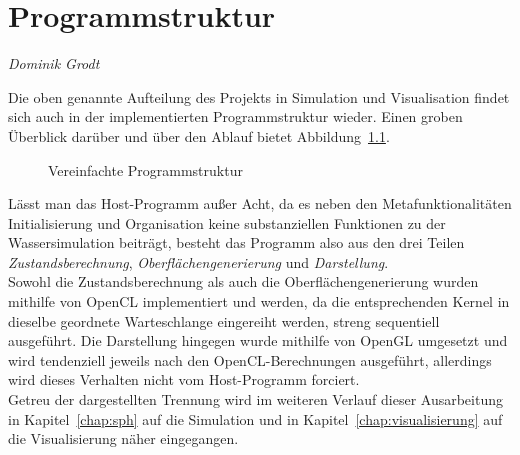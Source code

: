 \chapter{Programmstruktur}
\thispagestyle{empty}

\begin{center}
\emph{{\small Dominik Grodt}}
\end{center}

\bigskip

Die oben genannte Aufteilung des Projekts in Simulation und Visualisation findet sich auch in der implementierten Programmstruktur wieder. Einen groben Überblick darüber und über den Ablauf bietet Abbildung~\ref{fig:programmstruktur}.\\
\begin{figure}[h]
  \centering
    
  \caption{Vereinfachte Programmstruktur}
  \label{fig:programmstruktur}
\end{figure}

\noindent Lässt man das Host-Programm außer Acht, da es neben den Metafunktionalitäten Initialisierung und Organisation keine substanziellen Funktionen zu der Wassersimulation beiträgt, besteht das Programm also aus den drei Teilen \textit{Zustandsberechnung}, \textit{Oberflächengenerierung} und \textit{Darstellung}. \\
Sowohl die Zustandsberechnung als auch die Oberflächengenerierung wurden mithilfe von OpenCL implementiert und werden, da die entsprechenden Kernel in dieselbe geordnete Warteschlange eingereiht werden, streng sequentiell ausgeführt. Die Darstellung hingegen wurde mithilfe von OpenGL umgesetzt und wird tendenziell jeweils nach den OpenCL-Berechnungen ausgeführt, allerdings wird dieses Verhalten nicht vom Host-Programm forciert.\\
Getreu der dargestellten Trennung wird im weiteren Verlauf dieser Ausarbeitung in Kapitel~\ref{chap:sph} auf die Simulation und in Kapitel~\ref{chap:visualisierung} auf die Visualisierung näher eingegangen.